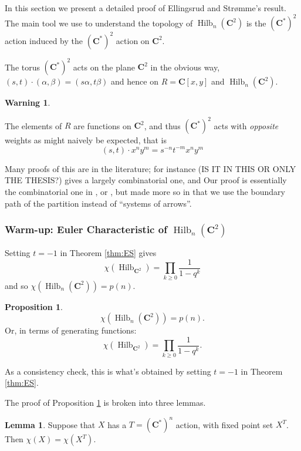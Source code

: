 \documentclass{amsart}[12pt]
\theoremstyle{definition}
\newtheorem{lemma}[dummy]{Lemma}
\newtheorem{proposition}[dummy]{Proposition}
\newtheorem{warning}[dummy]{Warning}
\newcommand{\C}{\mathbf{C}}
\DeclareMathOperator{\Hilb}{Hilb}
\begin{document}
In this section we present a detailed proof of Ellingsrud and Str\o mme's result.  The main tool we use to understand the topology of $\Hilb_n(\C^2)$ is the $(\C^*)^2$ action induced by the $(\C^*)^2$ action on $\C^2$.  

The torus $(\C^*)^2$ acts on the plane $\C^2$ in the obvious way, $(s,t)\cdot (\alpha,\beta)=(s\alpha,t\beta)$ and hence on $R=\C[x,y]$ and $\Hilb_n(\C^2)$.  

\begin{warning} \label{warning:action-sign}

 The elements of $R$ are functions on $\C^2$, and thus $(\C^*)^2$ acts with \emph{opposite} weights as might naively be expected, that is 
$$(s,t)\cdot x^ny^m=s^{-n}t^{-m}x^ny^m$$

\end{warning}




Many proofs of this are in the literature; for instance \cite{cheah} (IS IT IN THIS OR ONLY THE THESIS?) gives a largely combinatorial one, and \cite{nakajimabook}   Our proof is essentially the combinatorial one in \cite{cheah}, or , but made more so in that we use the boundary path of the partition instead of ``systems of arrows''.  






\subsubsection{Warm-up: Euler Characteristic of $\Hilb_n(\C^2)$}


Setting $t=-1$ in Theorem \ref{thm:ES} gives
$$\chi(\Hilb_{\C^2})=\prod_{k\geq 0} \frac{1}{1-q^k}$$
and so $\chi(\Hilb_n(\C^2))=p(n)$.

\begin{proposition} \label{prop:hilbchi}
$$\chi(\Hilb_n(\C^2))=p(n).$$
Or, in terms of generating functions:
$$\chi(\Hilb_{\C^2})=\prod_{k\geq 0} \frac{1}{1-q^k}.$$
\end{proposition}

As a consistency check, this is what's obtained by setting $t=-1$ in Theorem \ref{thm:ES}.


The proof of Proposition \ref{prop:hilbchi} is broken into three lemmas.

\begin{lemma} \label{lem:toruschi}
Suppose that $X$ has a $T=(\C^*)^n$ action, with fixed point set $X^T$.  Then $\chi(X)=\chi(X^T)$.
\end{lemma}
\end{document}
